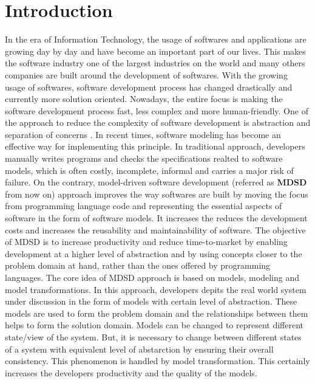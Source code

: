 \section{Introduction}\label{sec:introduction}
In the era of Information Technology, the usage of softwares and applications are growing day by day and have become an important part of our lives. This makes the software industry one of the largest industries on the world and many others companies are built around the development of softwares. With the growing usage of softwares, software development process has changed drastically and currently more solution oriented. Nowadays, the entire focus is making the software development process fast, less complex and more human-friendly. 
\newline\newline One of the approach to reduce the complexity of software development is abstraction and separation of concerns \cite{modeltransform}. In recent times, software modeling has become an effective way for implementing this principle. In traditional approach, developers manually writes programs and checks the specifications realted to software models, which is often costly, incomplete, informal and carries a major risk of failure. On the contrary, model-driven software development (referred as \textbf{MDSD} from now on) approach improves the way softwares are built by moving the focus from programming language code and representing the essential aspects of software in the form of software models. It increases the reduces the development costs and increases the reusability and maintainability of software. The objective of MDSD \cite{modeltransform} is to increase productivity and reduce time-to-market by enabling development at a higher level of abstraction and by using concepts closer to the problem domain at hand, rather than the ones offered by programming languages. 
\newline\newline The core idea of MDSD approach is based on models, modeling and model transformations. In this approach, developers depits the real world system under discussion in the form of models with certain level of abstraction. These models are used to form the problem domain and the relationships between them helps to form the solution domain. Models can be changed to represent different state/view of the system. But, it is necessary to change between different states of a system with equivalent level of abstarction by ensuring their overall consistency. This phenomenon is handled by model transformation. This certainly increases the developers productivity and the quality of the models.

